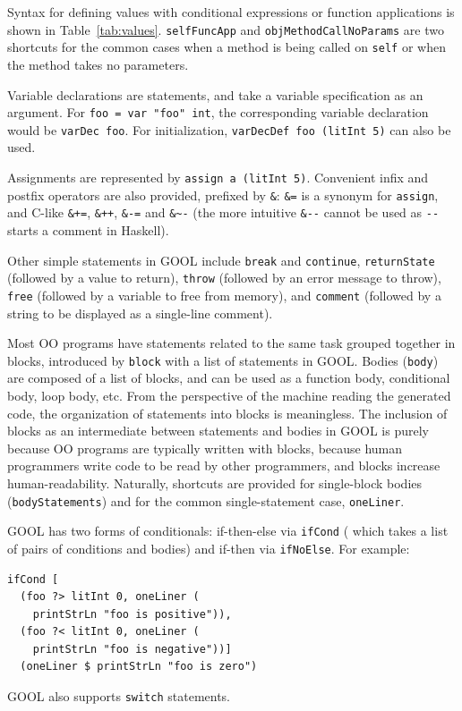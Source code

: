 \documentclass[sigplan,review,anonymous,prologue,dvipsnames]{acmart}
\begin{document}
Syntax for defining values with conditional expressions or function
applications is shown in Table~\ref{tab:values}. \verb|selfFuncApp| and
\verb|objMethodCallNoParams| are two shortcuts for the common cases when a
method is being called on \verb|self| or when the method takes no parameters.

Variable declarations are statements, and take a variable specification
as an argument. For \verb|foo = var "foo" int|, the corresponding variable
declaration would be \verb|varDec foo|.  For initialization, 
\verb|varDecDef foo (litInt 5)| can also be used.

Assignments are represented by \verb|assign a (litInt 5)|. Convenient
infix and postfix operators are also provided, prefixed by \verb|&|:
\verb|&=| is a synonym for \verb|assign|, and C-like
\verb|&+=|, \verb|&++|, \verb|&-=| and \verb|&~-| (the more intuitive
\verb|&--| cannot be used as \verb|--| starts a comment in Haskell).

Other simple statements in GOOL include \verb|break| and \verb|continue|,
\verb|returnState| (followed by a value to return), \verb|throw| (followed by an
error message to throw), \verb|free| (followed by a variable to free from
memory), and \verb|comment| (followed by a string to be displayed as a
single-line comment).

Most OO programs have statements related to the same task grouped together in 
blocks, introduced by \verb|block| with
a list of statements in GOOL. Bodies (\verb|body|) are composed
of a list of blocks, and can be used as a function body, conditional body, loop
body, etc. From the perspective of the machine reading the generated code, the 
organization of statements into blocks is meaningless. The inclusion of blocks 
as an intermediate between statements and bodies in GOOL is purely because OO 
programs are typically written with blocks, because human programmers write 
code to be read by other programmers, and blocks increase human-readability. 
Naturally, shortcuts
are provided for single-block bodies (\verb|bodyStatements|) and
for the common single-statement case, \verb|oneLiner|.

GOOL has two forms of conditionals: if-then-else via \verb|ifCond| (
which takes a list of pairs of conditions and bodies) and
if-then via \verb|ifNoElse|.  For example:
\begin{lstlisting}
ifCond [
  (foo ?> litInt 0, oneLiner (
    printStrLn "foo is positive")),
  (foo ?< litInt 0, oneLiner (
    printStrLn "foo is negative"))]
  (oneLiner $ printStrLn "foo is zero")
\end{lstlisting}
GOOL also supports \verb|switch| statements.
\end{document}

